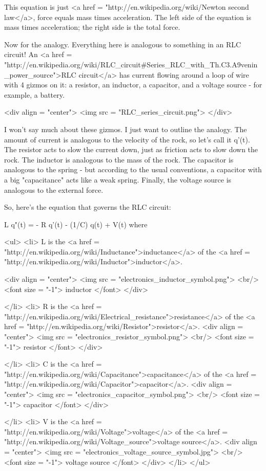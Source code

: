 This equation is just <a href =
"http://en.wikipedia.org/wiki/Newton%
second law</a>, force equals mass times acceleration.  The left side
of the equation is mass times acceleration; the right side is the
total force.

Now for the analogy.  Everything here is analogous to something in an
RLC circuit!  An <a href =
"http://en.wikipedia.org/wiki/RLC_circuit#Series_RLC_with_Th.C3.A9venin_power_source">RLC
circuit</a> has current flowing around a loop of wire with 4 gizmos on
it: a resistor, an inductor, a capacitor, and a voltage source - for
example, a battery.

<div align = "center">
<img src = "RLC_series_circuit.png">
</div>



I won't say much about these gizmos.  I just want to outline the
analogy.  The amount of current is analogous to the velocity of the
rock, so let's call it q'(t).  The resistor acts to slow the current
down, just as friction acts to slow down the rock.  The inductor is
analogous to the mass of the rock.  The capacitor is analogous to the
spring - but according to the usual conventions, a capacitor with a
big "capacitance" acts like a weak spring.  Finally, the
voltage source is analogous to the external force.

So, here's the equation that governs the RLC circuit:

L q"(t) = - R q'(t) - (1/C) q(t) + V(t)
where

<ul>
<li>
L is the <a href =
"http://en.wikipedia.org/wiki/Inductance">inductance</a> of the
<a href = "http://en.wikipedia.org/wiki/Inductor">inductor</a>.  

<div align = "center">
<img src = "electronics_inductor_symbol.png">
<br/>
<font size = "-1">
inductor
</font>
</div>

</li>
<li>
R is the <a href =
"http://en.wikipedia.org/wiki/Electrical_resistance">resistance</a> of the
<a href = "http://en.wikipedia.org/wiki/Resistor">resistor</a>.
<div align = "center">
<img src = "electronics_resistor_symbol.png">
<br/>
<font size = "-1">
resistor
</font>
</div>

</li>
<li>
C is the <a href =
"http://en.wikipedia.org/wiki/Capacitance">capacitance</a> of the
<a href = "http://en.wikipedia.org/wiki/Capacitor">capacitor</a>.
<div align = "center">
<img src = "electronics_capacitor_symbol.png">
<br/>
<font size = "-1">
capacitor
</font>
</div>

</li>
<li>
V is the <a href =
"http://en.wikipedia.org/wiki/Voltage">voltage</a> of the <a href = "http://en.wikipedia.org/wiki/Voltage_source">voltage source</a>.
<div align = "center">
<img src = "electronics_voltage_source_symbol.jpg">
<br/>
<font size = "-1">
voltage source
</font>
</div>
</li> </ul>

